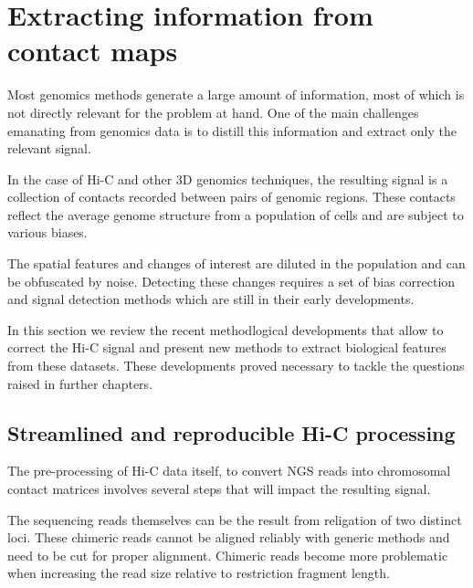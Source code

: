 
\chapter{Extracting information from contact maps} %

\label{ch:02-01} %


Most genomics methods generate a large amount of information, most of which is not directly relevant for the problem at hand. One of the main challenges emanating from genomics data is to distill this information and extract only the relevant signal.

In the case of Hi-C and other 3D genomics techniques, the resulting signal is a collection of contacts recorded between pairs of genomic regions. These contacts reflect the average genome structure from a population of cells and are subject to various biases.

The spatial features and changes of interest are diluted in the population and can be obfuscated by noise. Detecting these changes requires a set of bias correction and signal detection methods which are still in their early developments.

In this section we review the recent methodlogical developments that allow to correct the Hi-C signal and present new methods to extract biological features from these datasets. These developments proved necessary to tackle the questions raised in further chapters.

\section{Streamlined and reproducible Hi-C processing}
\label{sec:02-01:streamlined-processing}

The pre-processing of Hi-C data itself, to convert \acrfull{NGS} reads into chromosomal contact matrices involves several steps that will impact the resulting signal.

The sequencing reads themselves can be the result from religation of two distinct loci. These chimeric reads cannot be aligned reliably with generic methods and need to be cut for proper alignment. Chimeric reads become more problematic when increasing the read size relative to restriction fragment length.

